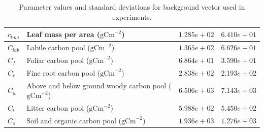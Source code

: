 \documentclass[11pt]{article}
\begin{document}
\begin{table}[ht]
\begin{center}
\begin{tabular}{| l | l | l | l |}
$c_{lma}$ & Leaf mass per area ($\text{gCm}^{-2}$) & $1.285e+02$ & $6.410e+01$ \\ \hline
$C_{lab}$ & Labile carbon pool ($\text{gCm}^{-2}$) & $1.365e+02$ & $6.626e+01$ \\ \hline
$C_{f}$ & Foliar carbon pool ($\text{gCm}^{-2}$) & $6.864e+01$ & $3.590e+01$  \\ \hline
$C_{r}$ & Fine root carbon pool ($\text{gCm}^{-2}$) & $2.838e+02$ & $2.193e+02$  \\ \hline
$C_{w}$ & Above and below ground woody carbon pool ($\text{gCm}^{-2}$) & $6.506e+03$ & $7.143e+03$  \\ \hline
$C_{l}$ & Litter carbon pool ($\text{gCm}^{-2}$) & $5.988e+02$ & $5.450e+02$ \\ \hline
$C_{s}$ & Soil and organic carbon pool ($\text{gCm}^{-2}$) & $1.936e+03$ & $1.276e+03$  \\ \hline
	\end{tabular}
	\caption{Parameter values and standard deviations for background vector used in experiments.}
	\label{table:xbvars}
\end{center} 
\end{table}
\end{document}
